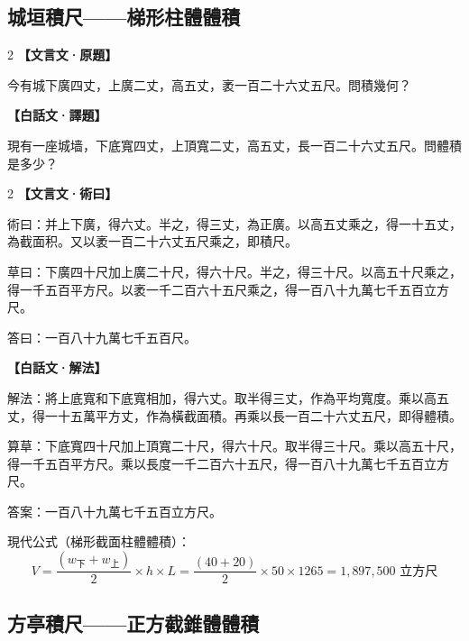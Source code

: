 \documentclass[11pt,a4paper]{article}
\newcommand{\zhc}{}[1]{{\CJKfamily{\CJKrmdefault}#1}}  %
\newcommand{\zhm}[1]{{\CJKfamily{\CJKrmdefault}#1}}  %
\newenvironment{prob bilingual}[1][]{%
  \begin{paracol}{2}%
  \setlength{\columnseprule}{0.4pt}%
}{%
  \end{paracol}%
  \medskip%
}
\begin{document}
\vspace{0.5cm}

\subsection{\zhc{城垣積尺——梯形柱體體積}}

\begin{paracol}{2}
\switchcolumn[0]
\noindent\textbf{\textcolor{notecolor}{\zhc{【文言文·原題】}}}\par\smallskip
\zhc{
今有城下廣四丈，上廣二丈，高五丈，袤一百二十六丈五尺。問積幾何？
}

\switchcolumn[1]
\noindent\textbf{\textcolor{notecolor}{\zhm{【白話文·譯題】}}}\par\smallskip
\zhm{
現有一座城墙，下底寬四丈，上頂寬二丈，高五丈，長一百二十六丈五尺。問體積是多少？
}
\end{paracol}

\medskip

\begin{paracol}{2}
\switchcolumn[0]
\noindent\textbf{\textcolor{notecolor}{\zhc{【文言文·術曰】}}}\par\smallskip
\zhc{
術曰：并上下廣，得六丈。半之，得三丈，為正廣。以高五丈乘之，得一十五丈，為截面积。又以袤一百二十六丈五尺乘之，即積尺。

草曰：下廣四十尺加上廣二十尺，得六十尺。半之，得三十尺。以高五十尺乘之，得一千五百平方尺。以袤一千二百六十五尺乘之，得一百八十九萬七千五百立方尺。

答曰：一百八十九萬七千五百尺。
}

\switchcolumn[1]
\noindent\textbf{\textcolor{notecolor}{\zhm{【白話文·解法】}}}\par\smallskip
\zhm{
解法：將上底寬和下底寬相加，得六丈。取半得三丈，作為平均寬度。乘以高五丈，得一十五萬平方丈，作為橫截面積。再乘以長一百二十六丈五尺，即得體積。

算草：下底寬四十尺加上頂寬二十尺，得六十尺。取半得三十尺。乘以高五十尺，得一千五百平方尺。乘以長度一千二百六十五尺，得一百八十九萬七千五百立方尺。

答案：一百八十九萬七千五百立方尺。

現代公式（梯形截面柱體體積）：
$$V = \frac{(w_{\text{下}} + w_{\text{上}})}{2} \times h \times L = \frac{(40+20)}{2} \times 50 \times 1265 = 1{,}897{,}500 \text{ 立方尺}$$
}
\end{paracol}

\vspace{0.5cm}

\subsection{\zhc{方亭積尺——正方截錐體體積}}
\end{document}
